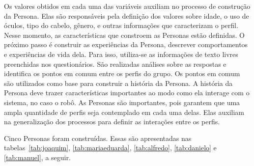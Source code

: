 Os valores obtidos em cada uma das variáveis auxiliam no processo de construção da Persona. Elas são responsáveis pela definição dos valores sobre idade, o uso de óculos, tipo do cabelo, gênero, e outras informações que caracterizam o perfil. Nesse momento, as características que constroem as Personas estão definidas. O próximo passo é construir as experiências da Persona, descrever comportamentos e experiências de vida dela. Para isso, utiliza-se as informações de texto livres preenchidas nos questionários. São realizadas análises sobre as respostas e identifica os pontos em comum entre os perfis do grupo. Os pontos em comum são utilizados como base para construir a história da Persona. A história da Persona deve trazer características importantes ao modo como ela interage com o sistema, no caso o robô. As Personas são importantes, pois garantem que uma ampla quantidade de perfis seja contemplado em cada uma delas. Elas auxiliam na generalização dos processos para definir as interações entre os perfis.

Cinco Personas foram construídas. Essas são apresentadas nas tabelas~\ref{tab:joaquim}, \ref{tab:mariaeduarda}, \ref{tab:alfredo}, \ref{tab:danielo} e \ref{tab:manuel}, a seguir.

